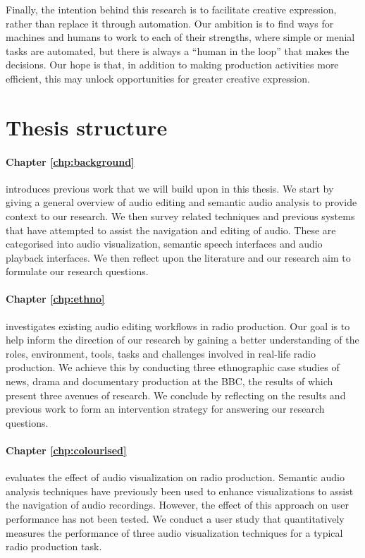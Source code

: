 Finally, the intention behind this research is to facilitate creative expression, rather than replace it through
automation.  Our ambition is to find ways for machines and humans to work to each of their strengths, where simple or
menial tasks are automated, but there is always a ``human in the loop'' that makes the decisions.  Our hope is that, in
addition to making production activities more efficient, this may unlock opportunities for greater creative expression.

\section{Thesis structure}\label{sec:intro/structure}

\paragraph{Chapter \ref{chp:background}} introduces previous work that we will build upon in this thesis. We start by
giving a general overview of audio editing and semantic audio analysis to provide context to our research. We then
survey related techniques and previous systems that have attempted to assist the navigation and editing of audio. These
are categorised into audio visualization, semantic speech interfaces and audio playback interfaces. We then reflect
upon the literature and our research aim to formulate our research questions.

\paragraph{Chapter \ref{chp:ethno}} investigates existing audio editing workflows in radio production. Our goal is to
help inform the direction of our research by gaining a better understanding of the roles, environment, tools, tasks and
challenges involved in real-life radio production.  We achieve this by conducting three ethnographic case studies of
news, drama and documentary production at the BBC, the results of which present three avenues of research.  We conclude
by reflecting on the results and previous work to form an intervention strategy for answering our research questions.

\paragraph{Chapter \ref{chp:colourised}} evaluates the effect of audio visualization on radio production.  Semantic
audio analysis techniques have previously been used to enhance visualizations to assist the navigation of audio
recordings. However, the effect of this approach on user performance has not been tested.  We conduct a user study that
quantitatively measures the performance of three audio visualization techniques for a typical radio production task.

